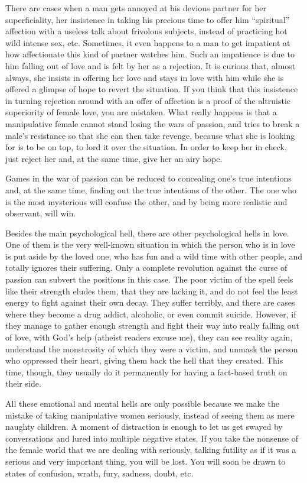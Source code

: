 \par There are cases when a man gets annoyed at his devious partner for her superficiality, her insistence in taking his precious time to offer him \enquote{spiritual} affection with a useless talk about frivolous subjects, instead of practicing hot wild intense sex, etc. Sometimes, it even happens to a man to get impatient at how affectionate this kind of partner watches him. Such an impatience is due to him falling out of love and is felt by her as a rejection. It is curious that, almost always, she insists in offering her love and stays in love with him while she is offered a glimpse of hope to revert the situation. If you think that this insistence in turning rejection around with an offer of affection is a proof of the altruistic superiority of female love, you are mistaken. What really happens is that a manipulative female cannot stand losing the wars of passion, and tries to break a male's resistance so that she can then take revenge, because what she is looking for is to be on top, to lord it over the situation. In order to keep her in check, just reject her and, at the same time, give her an airy hope.

\par Games in the war of passion can be reduced to concealing one's true intentions and, at the same time, finding out the true intentions of the other. The one who is the most mysterious will confuse the other, and by being more realistic and observant, will win.

\par Besides the main psychological hell, there are other psychological hells in love. One of them is the very well-known situation in which the person who is in love is put aside by the loved one, who has fun and a wild time with other people, and totally ignores their suffering. Only a complete revolution against the curse of passion can subvert the positions in this case. The poor victim of the spell feels like their strength eludes them, that they are lacking it, and do not feel the least energy to fight against their own decay. They suffer terribly, and there are cases where they become a drug addict, alcoholic, or even commit suicide. However, if they manage to gather enough strength and fight their way into really falling out of love, with God's help (atheist readers excuse me), they can see reality again, understand the monstrosity of which they were a victim, and unmask the person who oppressed their heart, giving them back the hell that they created. This time, though, they usually do it permanently for having a fact-based truth on their side.

\par All these emotional and mental hells are only possible because we make the mistake of taking manipulative women seriously, instead of seeing them as mere naughty children. A moment of distraction is enough to let us get swayed by conversations and lured into multiple negative states. If you take the nonsense of the female world that we are dealing with seriously, talking futility as if it was a serious and very important thing, you will be lost. You will soon be drawn to states of confusion, wrath, fury, sadness, doubt, etc.